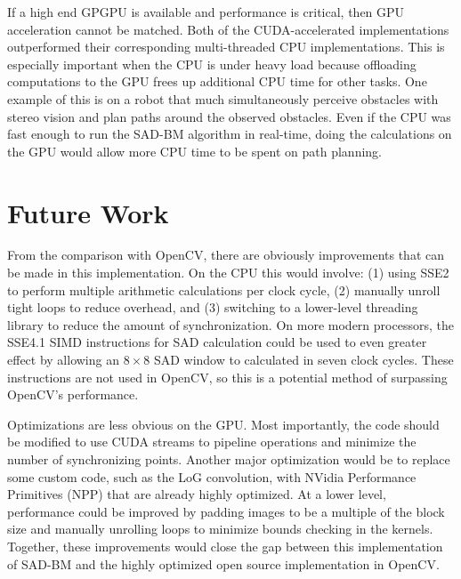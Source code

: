 \documentclass{article}
\begin{document}
If a high end GPGPU is available and performance is critical, then GPU
acceleration cannot be matched. Both of the CUDA-accelerated implementations
outperformed their corresponding multi-threaded CPU implementations. This is
especially important when the CPU is under heavy load because offloading
computations to the GPU frees up additional CPU time for other tasks. One
example of this is on a robot that much simultaneously perceive obstacles with
stereo vision and plan paths around the observed obstacles. Even if the CPU was
fast enough to run the SAD-BM algorithm in real-time, doing the calculations on
the GPU would allow more CPU time to be spent on path planning.

\section{Future Work}
\label{sec:future}
From the comparison with OpenCV, there are obviously improvements that can be
made in this implementation. On the CPU this would involve: (1) using SSE2 to
perform multiple arithmetic calculations per clock cycle, (2) manually unroll
tight loops to reduce overhead, and (3) switching to a lower-level threading
library to reduce the amount of synchronization. On more modern processors, the
SSE4.1 SIMD instructions for SAD calculation could be used to even greater
effect by allowing an $8 \times 8$ SAD window to calculated in seven clock
cycles. These instructions are not used in OpenCV, so this is a potential
method of surpassing OpenCV's performance.

Optimizations are less obvious on the GPU. Most importantly, the code should be
modified to use CUDA streams to pipeline operations and minimize the number of
synchronizing points. Another major optimization would be to replace some
custom code, such as the LoG convolution, with NVidia Performance Primitives
(NPP) that are already highly optimized. At a lower level, performance could be
improved by padding images to be a multiple of the block size and manually
unrolling loops to minimize bounds checking in the kernels. Together, these
improvements would close the gap between this implementation of SAD-BM and the
highly optimized open source implementation in OpenCV.

{}

\end{document}
